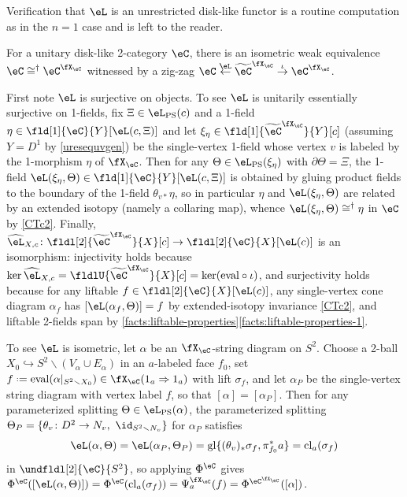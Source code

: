 \documentclass[12pt,reqno]{amsart}
\newcounter{alpha}\renewcommand\thealpha{\upshape\Alph{alpha}}
\newcommand{\glu}{\mathrm{gl}}
\newcommand{\cl}{\mathrm{cl}}
\newcommand{\eval}{\mathrm{eval}}
\newcommand{\psn}{\Phi}
\newcommand{\C}{\eC}
\renewcommand{\setminus}{\smallsetminus}
\renewcommand{\star}{\dag}
\DeclareRobustCommand{\coloneq}{\mathrel{\vcenter{\baselineskip0.5ex\lineskiplimit0pt\hbox{\scriptsize{\upshape.}}\hbox{\scriptsize{\upshape.}}}}=}
\begin{document}
Verification that $\eL$ is an unrestricted disk-like functor is a routine computation as in the $n=1$ case and is left to the reader.

\begin{proposition}
\label{CXCcongC-n2}
For a unitary disk-like 2-category $\C$, there is an isometric weak equivalence $\C\cong^\dag\C^{\fX_\C}$ witnessed by a zig-zag $\C\overset\eL\leftarrow\widetilde{\C}^{\fX_\C}\overset\iota\rightarrow\C^{\fX_\C}$.
\end{proposition}

\begin{pf}
First note $\eL$ is surjective on objects. To see $\eL$ is unitarily essentially surjective on 1-fields, fix $\Xi\in\eL_{\mathrm{PS}}(c)$ and a 1-field $\eta\in\fld[1]{\C}{Y}[\eL(c,\Xi)]$ and let $\xi_\eta \in \fld[1]{\widetilde{\C}^{\fX_\C}}{Y}[c]$ (assuming $Y=D^1$ by \cref{uresequvgen}) be the single-vertex 1-field whose vertex $v$ is labeled by the 1-morphism $\eta$ of $\fX_\C$. Then for any $\Theta \in \eL_{\mathrm{PS}}(\xi_\eta)$ with $\partial\Theta=\Xi$, the 1-field $\eL(\xi_\eta, \Theta) \in \fld[1]{\C}{Y}[ \eL(c,\Xi)]$ is obtained by gluing product fields to the boundary of the 1-field $\theta_{v*}\eta$, so in particular $\eta$ and $\eL(\xi_\eta, \Theta)$ are related by an extended isotopy (namely a collaring map), whence $\eL(\xi_\eta, \Theta) \cong^\star \eta$ in $\C$ by \ref{CTc2}. Finally, $\widehat{\eL}_{X,c} \colon \fldl[2]{\widetilde{\C}^{\fX_\C}}{X}[c] \to \fldl[2]{\C}{X}[\eL(c)]$ is an isomorphism: injectivity holds because $\ker\widehat{\eL}_{X,c} = \fldlU{\widetilde{\C}^{\fX_\C}}{X}[c] = \ker(\eval \circ \iota)$, and surjectivity holds because for any liftable $f \in \fldl[2]{\C}{X}[\eL(c)]$, any single-vertex cone diagram $\alpha_f$ has $[\eL(\alpha_f,\Theta)] = f$ by extended-isotopy invariance \ref{CTc2}, and liftable 2-fields span by \cref{facts:liftable-properties}\ref{facts:liftable-properties-1}.

To see $\eL$ is isometric, let $\alpha$ be an $\fX_\C$-string diagram on $S^2$. Choose a 2-ball $X_0 \hookrightarrow S^2 \setminus (V_\alpha \cup E_\alpha)$ in an $a$-labeled face $f_0$, set $f \coloneq \eval(\alpha|_{S^2 \setminus X_0}) \in \fX_\C(1_a \Rightarrow 1_a)$ with lift $\sigma_f$, and let $\alpha_P$ be the single-vertex string diagram with vertex label $f$, so that $[\alpha] = [\alpha_P]$. Then for any parameterized splitting $\Theta \in \eL_{\mathrm{PS}}(\alpha)$, the parameterized splitting $\Theta_P = \{\theta_v \colon D^2 \to N_v,\ \id_{S^2 \setminus N_v}\}$ for $\alpha_P$ satisfies
\[
\eL(\alpha,\Theta) 
= \eL(\alpha_P,\Theta_P)
= \glu\{(\theta_v)_*\sigma_f, \pi_{f_0}^* a\}
= \cl_a(\sigma_f)
\]
in $\undfldl[2]{\C}{S^2}$, so
applying $\psn^\C$ gives
$
\psn^\C([\eL(\alpha,\Theta)]) 
= \psn^\C(\cl_a(\sigma_f))
= \Psi^{\fX_\C}_a(f)
= \psn^{\C^{\fX_\C}}([\alpha])
$.
\end{pf}
\end{document}
